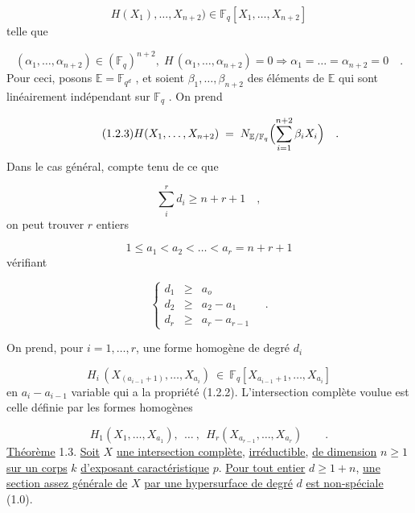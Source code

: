 \begin{equation}\tag{1.2.1}
 H(X_1),\dots,X_{n+2}) \in \mathbb{F}_q[X_1,\dots,X_{n+2}]
\end{equation}
telle que

\begin{equation}\tag{1.2.2}
(\alpha_1,\dots,\alpha_{n+2}) \in (\mathbb{F}_q)^{n+2}, \; H\,(\alpha_1,\dots,\alpha_{n+2}) = 0 \Longrightarrow \alpha_1 = \dots = \alpha_{n+2} = 0 \quad .
\end{equation}
Pour ceci, posons $\mathbb{E} = \mathbb{F}_{q^d}$ , et soient $\beta_1,\dots,\beta_{n+2}$ des éléments de $\mathbb{E}$ qui sont linéairement indépendant sur $\mathbb{F}_q$ . On prend

\begin{equation}\tag{1.2.3}
H(X_1,\dots,X_{n+2}) \;=\; N_{\mathbb{E}/\mathbb{F}_q} \Bigl( \sum_{i=1}^{n+2} \beta_i X_i \Bigr) \quad .
\end{equation}
Dans le cas général, compte tenu de ce que

\begin{equation}\tag{1.2.4}
\sum_i^r d_i \geq n+r+1 \quad ,
\end{equation}
on peut trouver $r$ entiers

\begin{equation}\tag{1.2.5}
1 \leq a_1 < a_2 < \dots < a_r = n+r+1
\end{equation}
vérifiant

\begin{equation}\tag{1.2.6}
\left\{ \begin{array}{lcl} d_1 & \geq & a_o \\[3ex] d_2 & \geq & a_2 - a_1 \\[3ex] d_r & \geq & a_r - a_{r-1} \end{array} \right. \quad .
\end{equation}


On prend, pour $i = 1,\dots,r$, une forme homogène de degré $d_i$

\begin{equation*}
H_i \, (X_{(a_{i-1}+1)},\dots,X_{a_i}) \ \in \ \mathbb{F}_q[X_{a_{i-1}+1},\dots,X_{a_i}]
\end{equation*}
en $a_i - a_{i-1}$ variable  qui a la propriété (1.2.2). L'intersection complète voulue est celle définie par les formes homogènes

\begin{equation*}
H_1(X_1,\dots,X_{a_1}), \ \ \dots\ , \ \ H_r(X_{a_{r-1}},\dots,X_{a_r}) \qquad .
\end{equation*}
\underline{Théorème} 1.3.  \underline{Soit} $X$ \underline{une intersection complète}, \underline{irréductible}, \underline{de dimension} $n \geq 1$ \underline{sur un corps} $k$ \underline{d'exposant caractéristique} $p$. \underline{Pour tout entier} $d \geq 1 + n$, \underline{une section assez générale de} $X$ \underline{par une hypersurface de degré} $d$ \underline{est non-spéciale} (1.0).


